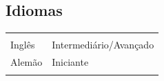 \documentclass[a4paper,10pt]{article}
\begin{document}
	\center\subsection*{Idiomas}
	\begin{center}
		\begin{tabular}{>{\raggedleft}p{2cm}|p{2cm}}
			\multicolumn{2}{c}{} \\
			Inglês & Intermediário/Avançado \\
			Alemão & Iniciante \\
			\multicolumn{2}{c}{} \\
		\end{tabular}
	\end{center}
\end{document}

